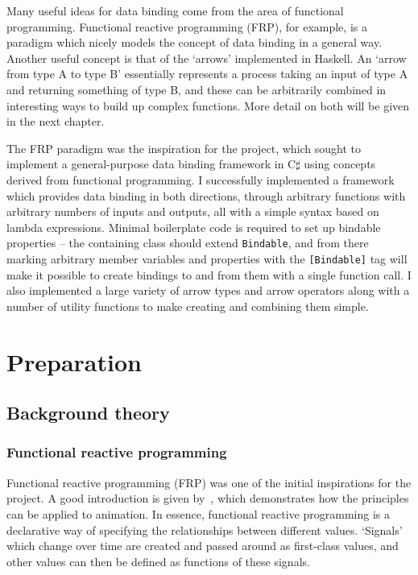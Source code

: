 \documentclass[12pt,twoside,notitlepage]{report}
\begin{document}
Many useful ideas for data binding come from the area of functional programming. Functional reactive programming (FRP), for example, is a paradigm which nicely models the concept of data binding in a general way. Another useful concept is that of the `arrows' implemented in Haskell. An `arrow from type A to type B' essentially represents a process taking an input of type A and returning something of type B, and these can be arbitrarily combined in interesting ways to build up complex functions. More detail on both will be given in the next chapter.

The FRP paradigm was the inspiration for the project, which sought to implement a general-purpose data binding framework in C$\sharp$ using concepts derived from functional programming. I successfully implemented a framework which provides data binding in both directions, through arbitrary functions with arbitrary numbers of inputs and outputs, all with a simple syntax based on lambda expressions. Minimal boilerplate code is required to set up bindable properties -- the containing class should extend \texttt{Bindable}, and from there marking arbitrary member variables and properties with the \texttt{[Bindable]} tag will make it possible to create bindings to and from them with a single function call. I also implemented a large variety of arrow types and arrow operators along with a number of utility functions to make creating and combining them simple.

\cleardoublepage



\chapter{Preparation}

\section{Background theory}

\subsection{Functional reactive programming}

Functional reactive programming (FRP) was one of the initial inspirations for the project. A good introduction is given by~\cite{composing_reactive_animations}, which demonstrates how the principles can be applied to animation. In essence, functional reactive programming is a declarative way of specifying the relationships between different values. `Signals' which change over time are created and passed around as first-class values, and other values can then be defined as functions of these signals.
\end{document}
